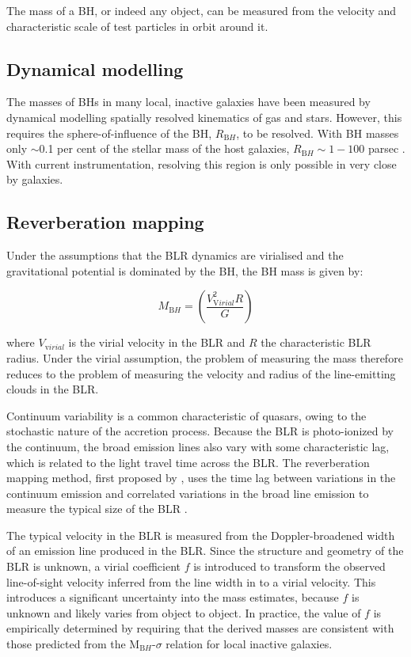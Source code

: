 The mass of a BH, or indeed any object, can be measured from the velocity and characteristic scale of test particles in orbit around it. 

\subsection{Dynamical modelling}

The masses of BHs in many local, inactive galaxies have been measured by dynamical modelling spatially resolved kinematics of gas and stars. 
However, this requires the sphere-of-influence of the BH, $R_{\mathrm BH}$, to be resolved. 
With BH masses only $\sim$0.1 per cent of the stellar mass of the host galaxies, $R_{\mathrm BH}\sim1-100$ parsec \citep{kormendy13}.
With current instrumentation, resolving this region is only possible in very close by galaxies. 

\subsection{Reverberation mapping}

Under the assumptions that the BLR dynamics are virialised  and the gravitational potential is dominated by the BH, the BH mass is given by:

\begin{equation}
M_{\mathrm BH} = \left( \frac{V_{\mathrm Virial}^2R}{G} \right)
\end{equation}

where $V_{\mathrm virial}$ is the virial velocity in the BLR and $R$ the characteristic BLR radius.
Under the virial assumption, the problem of measuring the mass therefore reduces to the problem of measuring the velocity and radius of the line-emitting clouds in the BLR. 

Continuum variability is a common characteristic of quasars, owing to the stochastic nature of the accretion process.  
Because the BLR is photo-ionized by the continuum, the broad emission lines also vary with some characteristic lag, which is related to the light travel time across the BLR. 
The reverberation mapping method, first proposed by \citet{blandford82a}, uses the time lag between variations in the continuum emission and correlated variations in the broad line emission to measure the typical size of the BLR \citep[e.g.][]{peterson93,netzer97,peterson14}. 

The typical velocity in the BLR is measured from the Doppler-broadened width of an emission line produced in the BLR. 
Since the structure and geometry of the BLR is unknown, a virial coefficient $f$ is introduced to transform the observed line-of-sight velocity inferred from the line width in to a virial velocity.
This introduces a significant uncertainty into the mass estimates, because $f$ is unknown and likely varies from object to object.  
In practice, the value of $f$ is empirically determined by requiring that the derived masses are consistent with those predicted from the M$_{\mathrm BH}$-$\sigma$ relation for local inactive galaxies. 

